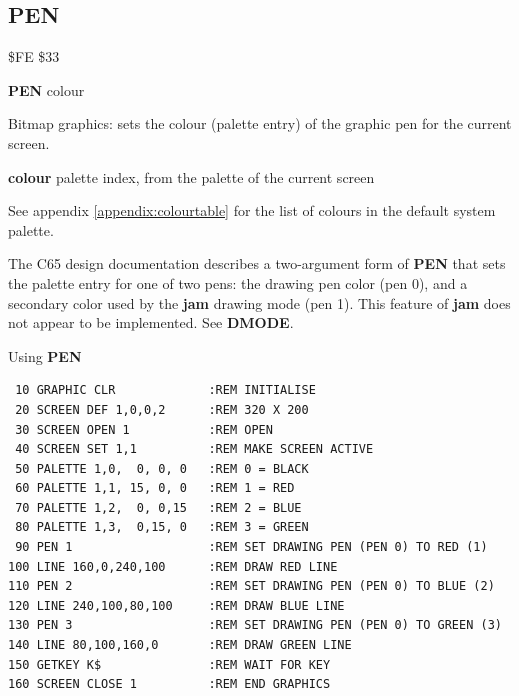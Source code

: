 \subsection{PEN}
\begin{description}[leftmargin=2cm,style=nextline]
\item [Token:] \$FE \$33
\item [Format:] {\bf PEN} colour
\item [Usage:]  Bitmap graphics: sets the colour (palette entry) of the graphic pen for the current screen.

  {\bf colour} palette index, from the palette of the current screen

  See appendix \vref{appendix:colourtable}
  for the list of colours in the default system palette.

\item [Remarks:]
  The C65 design documentation describes a two-argument form of {\bf PEN} that sets the palette entry for one of two pens: the drawing pen color (pen 0), and a secondary color used by the {\bf jam} drawing mode (pen 1). This feature of {\bf jam} does not appear to be implemented. See {\bf DMODE}.

\item [Example:] Using {\bf PEN}

\begin{tcolorbox}[colback=black,coltext=white]
\verbatimfont{\codefont}
\begin{verbatim}
 10 GRAPHIC CLR             :REM INITIALISE
 20 SCREEN DEF 1,0,0,2      :REM 320 X 200
 30 SCREEN OPEN 1           :REM OPEN
 40 SCREEN SET 1,1          :REM MAKE SCREEN ACTIVE
 50 PALETTE 1,0,  0, 0, 0   :REM 0 = BLACK
 60 PALETTE 1,1, 15, 0, 0   :REM 1 = RED
 70 PALETTE 1,2,  0, 0,15   :REM 2 = BLUE
 80 PALETTE 1,3,  0,15, 0   :REM 3 = GREEN
 90 PEN 1                   :REM SET DRAWING PEN (PEN 0) TO RED (1)
100 LINE 160,0,240,100      :REM DRAW RED LINE
110 PEN 2                   :REM SET DRAWING PEN (PEN 0) TO BLUE (2)
120 LINE 240,100,80,100     :REM DRAW BLUE LINE
130 PEN 3                   :REM SET DRAWING PEN (PEN 0) TO GREEN (3)
140 LINE 80,100,160,0       :REM DRAW GREEN LINE
150 GETKEY K$               :REM WAIT FOR KEY
160 SCREEN CLOSE 1          :REM END GRAPHICS
\end{verbatim}
\end{tcolorbox}
\end{description}


